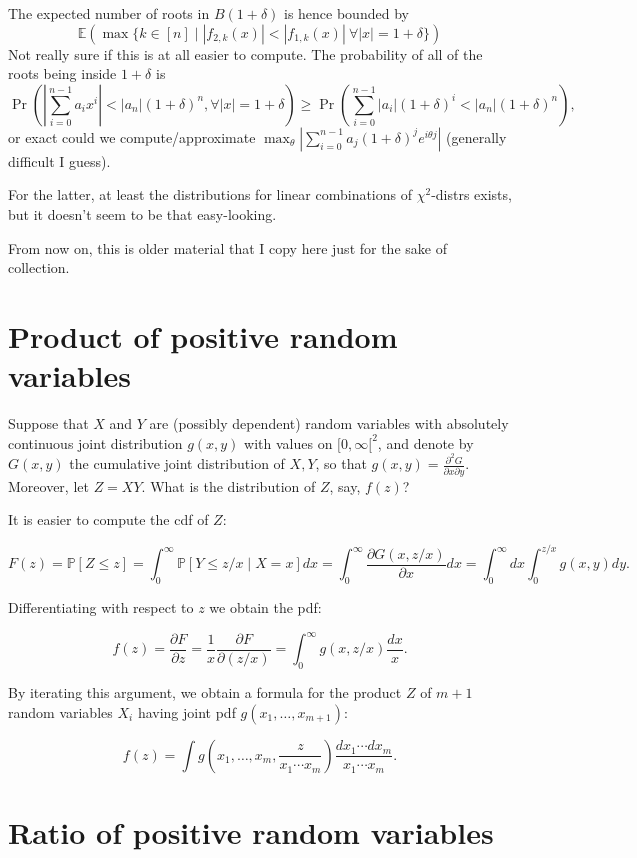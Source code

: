 \documentclass[12pt]{article}
\def\E{\mathbb{E}}
\def\P{\mathbb{P}}
\begin{document}
The expected number of roots in $B(1+\delta)$ is hence bounded by 
\[
\E \left( \max \{ k \in [n] \mid |f_{2,k}(x)| < |f_{1,k}(x)| ~\forall |x| = 1+\delta \} \right) 
\]
Not really sure if this is at all easier to compute. The probability of all of the roots being inside $1+\delta$ is 
\[  \Pr \left( \left| \sum_{i=0}^{n-1} a_ix^i  \right| < |a_n|(1+\delta)^n, \forall |x| = 1+\delta \right) \geq \Pr \left(  \sum_{i=0}^{n-1} |a_i|(1+\delta)^i < |a_n|(1+\delta)^n \right) ,  \]
or exact could we compute/approximate $\max_{\theta} \left| \sum_{i=0}^{n-1} a_j(1+\delta)^j e^{i\theta j}  \right|$ (generally difficult I guess).

For the latter, at least the distributions for linear combinations of $\chi^2$-distrs exists, but it doesn't seem to be that easy-looking.

\newpage

From now on, this is older material that I copy here just for the sake of collection.

\section{Product of positive random variables}

Suppose that $X$ and $Y$ are (possibly dependent) random variables with absolutely continuous joint distribution $g(x,y)$ with values on $[0,\infty[^2$, and denote by $G(x,y)$ the cumulative joint distribution of $X,Y$, so that $g(x,y)=\frac{\partial^2 G}{\partial x \partial y}$. Moreover, let $Z=XY$. What is the distribution of $Z$, say, $f(z)$?

It is easier to compute the cdf of $Z$:

\[   F(z) =  \P[Z \leq z] =\int_0^\infty \P[Y \leq z/x \mid X=x] dx  =\int_0^\infty \frac{\partial G(x,z/x)}{\partial x} dx = \int_0^\infty dx \int_0^{z/x} g(x,y)dy.  \]

Differentiating with respect to $z$ we obtain the pdf:

\[ f(z) = \frac{\partial F}{\partial z}  = \frac{1}{x} \frac{\partial F}{\partial (z/x)}  = \int_0^\infty g(x,z/x) \frac{dx}{x}. \]

By iterating this argument, we obtain a formula for the product $Z$ of $m+1$ random variables $X_i$ having joint pdf $g(x_1,\dots,x_{m+1})$:

\[  f(z) = \int g\left(x_1,\dots,x_{m},\frac{z}{x_1 \cdots x_{m}} \right) \frac{d x_1 \cdots d x_{m}}{x_1 \cdots x_m}. \]  

\section{Ratio of positive random variables}
\end{document}
